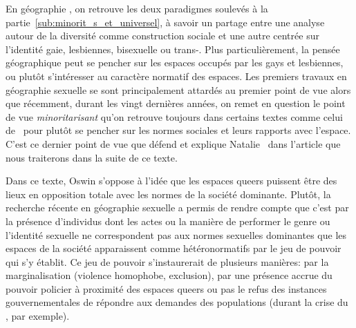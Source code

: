 
En géographie \qu{}, on retrouve les deux paradigmes soulevés à la partie~\ref{sub:minorit_s_et_universel}, à savoir un partage entre une analyse autour de la diversité comme construction sociale et une autre centrée sur l'identité gaie, lesbiennes, bisexuelle ou trans-. 
Plus particulièrement, la pensée géographique peut se pencher sur les espaces occupés par les gays et lesbiennes, ou plutôt s'intéresser au caractère normatif des espaces. 
Les premiers travaux en géographie sexuelle se sont principalement attardés au premier point de vue alors que récemment, durant les vingt dernières années, on remet en question le point de vue \emph{minoritarisant} qu'on retrouve toujours dans certains textes comme celui de~\citet{Sinfield1996} pour plutôt se pencher sur les normes sociales et leurs rapports avec l'espace. 
C'est ce dernier point de vue que défend et explique Natalie~\citet{Oswin2008} dans l'article  que nous traiterons dans la suite de ce texte.

Dans ce texte, Oswin s'oppose à l'idée que les espaces queers puissent être des lieux en opposition totale avec les normes de la société dominante. 
Plutôt, la recherche récente en géographie sexuelle a permis de rendre compte que c'est par la présence d'individus dont les actes ou la manière de performer le genre ou l'identité sexuelle ne correspondent pas aux normes sexuelles dominantes que les espaces de la société apparaissent comme hétéronormatifs par le jeu de pouvoir qui s'y établit. 
Ce jeu de pouvoir s'instaurerait de plusieurs manières: par la marginalisation (violence homophobe, exclusion), par une présence accrue du pouvoir policier à proximité des espaces queers ou pas le refus des instances gouvernementales de répondre aux demandes des populations \lgbt{} (durant la crise du \sida, par exemple).

